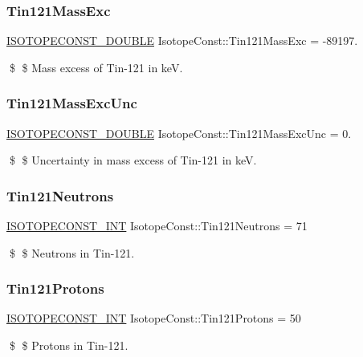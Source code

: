 \subsubsection{\texorpdfstring{Tin121\+Mass\+Exc}{Tin121MassExc}}
{\footnotesize\ttfamily \mbox{\hyperlink{group___isotope_const-_macros_ga8f45a7272ce02c0b4c65c44636ed719a}{I\+S\+O\+T\+O\+P\+E\+C\+O\+N\+S\+T\+\_\+\+D\+O\+U\+B\+LE}} Isotope\+Const\+::\+Tin121\+Mass\+Exc = -\/89197.}

\$ \$ Mass excess of Tin-\/121 in keV. \mbox{\label{group___isotope_const-_tin-_sn121_ga15370f19140e27f5a1e0f07c290e35ee}} 
\subsubsection{\texorpdfstring{Tin121\+Mass\+Exc\+Unc}{Tin121MassExcUnc}}
{\footnotesize\ttfamily \mbox{\hyperlink{group___isotope_const-_macros_ga8f45a7272ce02c0b4c65c44636ed719a}{I\+S\+O\+T\+O\+P\+E\+C\+O\+N\+S\+T\+\_\+\+D\+O\+U\+B\+LE}} Isotope\+Const\+::\+Tin121\+Mass\+Exc\+Unc = 0.}

\$ \$ Uncertainty in mass excess of Tin-\/121 in keV. \mbox{\label{group___isotope_const-_tin-_sn121_ga5b11585c595bc4a815949d5233c0fa2f}} 
\subsubsection{\texorpdfstring{Tin121\+Neutrons}{Tin121Neutrons}}
{\footnotesize\ttfamily \mbox{\hyperlink{group___isotope_const-_macros_ga5f18360b3e99483a35c32d789e62621c}{I\+S\+O\+T\+O\+P\+E\+C\+O\+N\+S\+T\+\_\+\+I\+NT}} Isotope\+Const\+::\+Tin121\+Neutrons = 71}

\$ \$ Neutrons in Tin-\/121. \mbox{\label{group___isotope_const-_tin-_sn121_ga1c6d153b534ee6c444a997a4e7d7eef3}} 
\subsubsection{\texorpdfstring{Tin121\+Protons}{Tin121Protons}}
{\footnotesize\ttfamily \mbox{\hyperlink{group___isotope_const-_macros_ga5f18360b3e99483a35c32d789e62621c}{I\+S\+O\+T\+O\+P\+E\+C\+O\+N\+S\+T\+\_\+\+I\+NT}} Isotope\+Const\+::\+Tin121\+Protons = 50}

\$ \$ Protons in Tin-\/121. 